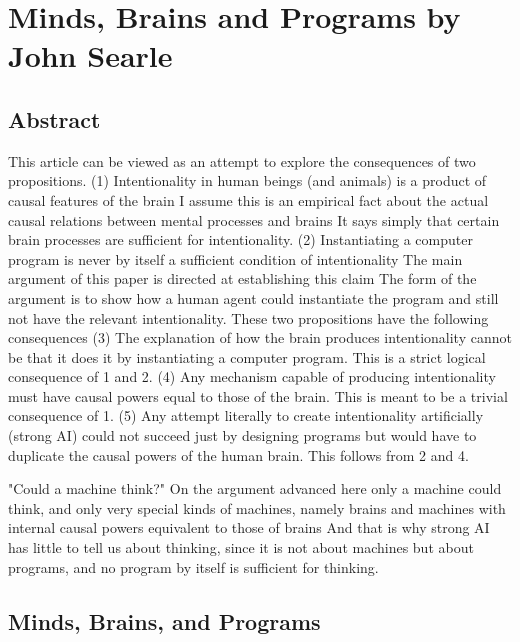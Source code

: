 \chapter{Minds, Brains and Programs by John Searle}\autocite{Searle1}
\label{mindsbrainsprograms}
\section{Abstract}
This article can be viewed as an attempt to explore the consequences of two propositions. (1) Intentionality in
human beings (and animals) is a product of causal features of the brain I assume this is an empirical fact about
the actual causal relations between mental processes and brains It says simply that certain brain processes are
sufficient for intentionality. (2) Instantiating a computer program is never by itself a sufficient condition of
intentionality The main argument of this paper is directed at establishing this claim The form of the argument is to
show how a human agent could instantiate the program and still not have the relevant intentionality. These two
propositions have the following consequences (3) The explanation of how the brain produces intentionality
cannot be that it does it by instantiating a computer program. This is a strict logical consequence of 1 and 2. (4)
Any mechanism capable of producing intentionality must have causal powers equal to those of the brain. This is
meant to be a trivial consequence of 1. (5) Any attempt literally to create intentionality artificially (strong AI)
could not succeed just by designing programs but would have to duplicate the causal powers of the human
brain. This follows from 2 and 4.

"Could a machine think?" On the argument advanced here only a machine could think, and only very special
kinds of machines, namely brains and machines with internal causal powers equivalent to those of brains And
that is why strong AI has little to tell us about thinking, since it is not about machines but about programs, and
no program by itself is sufficient for thinking.

\section{Minds, Brains, and Programs}

